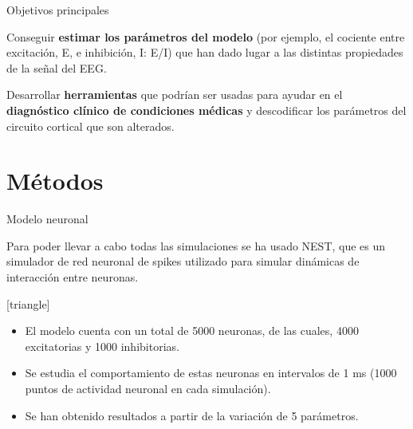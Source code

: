 \documentclass{beamer}
\begin{document}
\begin{frame}{Objetivos principales}

Conseguir \textbf{estimar los parámetros del modelo} (por ejemplo, el cociente entre excitación, E, e inhibición, I: E/I) que han dado lugar a las distintas propiedades de la señal del EEG.

\vspace{4mm}
\pause

 Desarrollar \textbf{herramientas} que podrían ser usadas para ayudar en el \textbf{diagnóstico clínico de condiciones médicas} y descodificar los parámetros del circuito cortical que son alterados.

\end{frame}

\section{Métodos}
 
\begin{frame}{Modelo neuronal}

Para poder llevar a cabo todas las simulaciones se ha usado NEST, que es un simulador de red neuronal de spikes utilizado para simular dinámicas de interacción entre neuronas. 

\vfill
\pause
{}[triangle]
    \begin{itemize}
        \item El modelo cuenta con un total de 5000 neuronas, de las cuales, 4000 excitatorias y 1000 inhibitorias.
        \vspace{2mm}
        \pause
        \item Se estudia el comportamiento de estas neuronas en intervalos de 1 ms (1000 puntos de actividad neuronal en cada simulación).
        \vspace{2mm}
        \pause
        \item Se han obtenido resultados a partir de la variación de 5 parámetros.
        \vspace{2mm}  
    \end{itemize}    

\end{frame}
\end{document}
